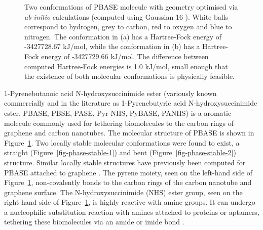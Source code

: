 \documentclass[
  a4paper,
]{scrbook}
\begin{document}
\begin{figure}
\begin{minipage}[t]{0.47\linewidth}
{{}

}

\subcaption{\label{fig-pbase-stable-2}}
\end{minipage}%

\caption{\label{fig-pbase-structure}Two conformations of PBASE molecule
with geometry optimised via \emph{ab initio} calculations (computed
using Gaussian 16 \autocite{g16}). White balls correspond to hydrogen,
grey to carbon, red to oxygen and blue to nitrogen. The conformation in
(a) has a Hartree-Fock energy of -3427728.67 kJ/mol, while the
conformation in (b) has a Hartree-Fock energy of -3427729.66 kJ/mol. The
difference between computed Hartree-Fock energies is 1.0 kJ/mol, small
enough that the existence of both molecular conformations is physically
feasible.}

\end{figure}

1-Pyrenebutanoic acid N-hydroxysuccinimide ester (variously known
commercially and in the literature as 1-Pyrenebutyric acid
N-hydroxysuccinimide ester, PBASE, PBSE, PASE, Pyr-NHS, PyBASE, PANHS)
is a aromatic molecule commonly used for tethering biomolecules to the
carbon rings of graphene and carbon nanotubes. The molecular structure
of PBASE is shown in Figure~\ref{fig-pbase-structure}. Two locally
stable molecular conformations were found to exist, a straight
(Figure~\ref{fig-pbase-stable-1}) and bent
(Figure~\ref{fig-pbase-stable-2}) structure. Similar locally stable
structures have previously been computed for PBASE attached to graphene
\autocite{Oishi2022}. The pyrene moiety, seen on the left-hand side of
Figure~\ref{fig-pbase-structure}, non-covalently bonds to the carbon
rings of the carbon nanotube and graphene surface. The
N-hydroxysuccinimide (NHS) ester group, seen on the right-hand side of
Figure~\ref{fig-pbase-structure}, is highly reactive with amine groups.
It can undergo a nucleophilic substitution reaction with amines attached
to proteins or aptamers, tethering these biomolecules via an amide or
imide bond
\autocite{Chen2001,Hermanson2013-16,Hermanson2013-3,Mishyn2022}.

\newpage
{}
\end{document}
